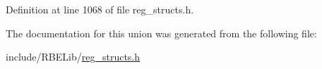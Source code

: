 Definition at line 1068 of file reg\+\_\+structs.\+h.



The documentation for this union was generated from the following file\+:\begin{DoxyCompactItemize}
\item 
include/\+R\+B\+E\+Lib/\hyperlink{reg__structs_8h}{reg\+\_\+structs.\+h}\end{DoxyCompactItemize}

